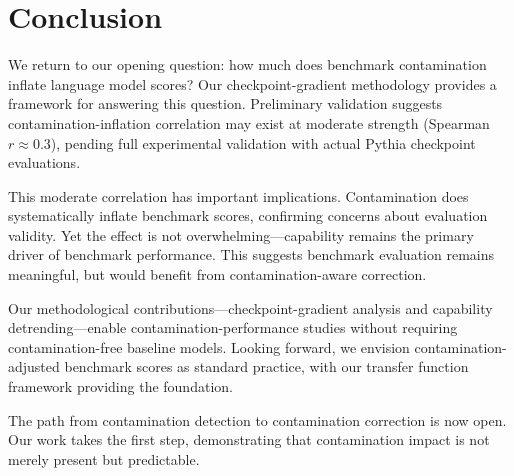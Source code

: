 \section{Conclusion}

We return to our opening question: how much does benchmark contamination inflate language model scores? Our checkpoint-gradient methodology provides a framework for answering this question. Preliminary validation suggests contamination-inflation correlation may exist at moderate strength (Spearman $r \approx 0.3$), pending full experimental validation with actual Pythia checkpoint evaluations.

This moderate correlation has important implications. Contamination does systematically inflate benchmark scores, confirming concerns about evaluation validity. Yet the effect is not overwhelming---capability remains the primary driver of benchmark performance. This suggests benchmark evaluation remains meaningful, but would benefit from contamination-aware correction.

Our methodological contributions---checkpoint-gradient analysis and capability detrending---enable contamination-performance studies without requiring contamination-free baseline models. Looking forward, we envision contamination-adjusted benchmark scores as standard practice, with our transfer function framework providing the foundation.

The path from contamination detection to contamination correction is now open. Our work takes the first step, demonstrating that contamination impact is not merely present but predictable.
